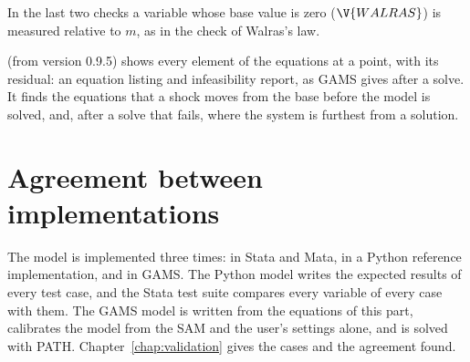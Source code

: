 In the last two checks a variable whose base value is zero ($\V{WALRAS}$) is
measured relative to $m$, as in the check of Walras's law.

 (from version 0.9.5) shows every element of the equations
at a point, with its residual: an equation listing and infeasibility report, as
GAMS gives after a solve. It finds the equations that a shock moves from the
base before the model is solved, and, after a solve that fails, where the
system is furthest from a solution.

\section{Agreement between implementations}

The model is implemented three times: in Stata and Mata, in a Python
reference implementation, and in GAMS. The Python model writes the expected
results of every test case, and the Stata test suite compares every variable
of every case with them. The GAMS model is written from the equations of this
part, calibrates the model from the SAM and the user's settings alone, and is
solved with PATH. Chapter~\ref{chap:validation} gives the cases and the
agreement found.
